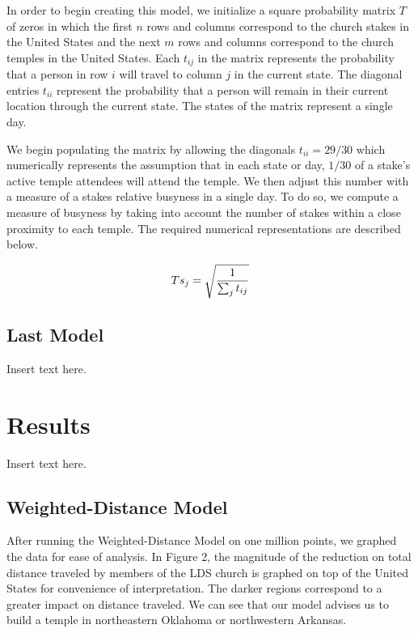 \documentclass[twoside,twocolumn]{article}
\begin{document}
In order to begin creating this model, we initialize a square probability matrix $T$ of zeros in which the first $n$ rows and columns correspond to the church stakes in the United States and the next $m$ rows and columns correspond to the church temples in the United States.
Each $t_{ij}$ in the matrix represents the probability that a person in row $i$ will travel to column $j$ in the current state. The diagonal entries $t_{ii}$ represent the probability that a person will remain in their current location through the current state.
The states of the matrix represent a single day.

We begin populating the matrix by allowing the diagonals $t_{ii} = 29/30$ which numerically represents the assumption that in each state or day, $1/30$ of a stake's active temple attendees will attend the temple.
We then adjust this number with a measure of a stakes relative busyness in a single day.
To do so, we compute a measure of busyness by taking into account the number of stakes within a close proximity to each temple.
The required numerical representations are described below.

\begin{equation}
\begin{aligned}
Ts_j = \sqrt{1\over{\sum_j{t_{ij}}}}
\end{aligned}
\end{equation}


\subsection{Last Model} %
Insert text here.

\section{Results}
\label{sec:res}
Insert text here.

\subsection{Weighted-Distance Model}
After running the Weighted-Distance Model on one million points, we graphed the data for ease of analysis.
In Figure 2, the magnitude of the reduction on total distance traveled by members of the LDS church is graphed on top of the United States for convenience of interpretation.
The darker regions correspond to a greater impact on distance traveled.
We can see that our model advises us to build a temple in northeastern Oklahoma or northwestern Arkansas.
\end{document}
